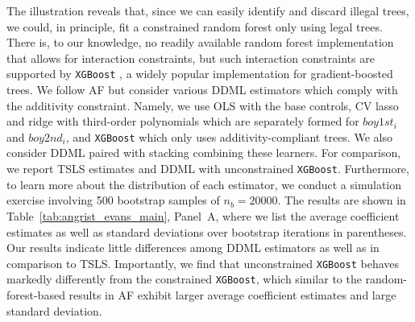 The illustration reveals that, since we can easily identify and discard illegal trees, we could, in principle, fit a constrained random forest only using legal trees. There is, to our knowledge, no readily available random forest implementation that allows for interaction constraints, but such interaction constraints are supported by \texttt{XGBoost} \citep{chen2016}, a widely popular implementation for gradient-boosted trees. %
We follow AF but consider various DDML estimators which comply with the additivity constraint. Namely, we use OLS with the base controls, CV lasso and ridge with third-order polynomials which are separately formed for $boy1st_i$ and $boy2nd_i$, and \texttt{XGBoost} which only uses additivity-compliant trees. We also consider DDML paired with stacking combining these learners. For comparison, we report TSLS estimates and DDML with unconstrained \texttt{XGBoost}. Furthermore, to learn more about the distribution of each estimator, we conduct a simulation exercise involving 500 bootstrap samples of $n_b=20000$. The results are shown in Table~\ref{tab:angrist_evans_main}, Panel~A, where we list the average coefficient estimates as well as standard deviations over bootstrap iterations in parentheses. Our results indicate little differences among DDML estimators as well as in comparison to TSLS. Importantly, we find that unconstrained \texttt{XGBoost} behaves markedly differently from the constrained \texttt{XGBoost}, which similar to the random-forest-based results in AF exhibit larger average coefficient estimates and large standard deviation. 

